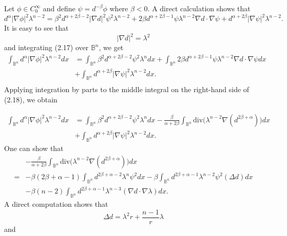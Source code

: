 \documentclass[12pt]{amsart}
\numberwithin{equation}{section}
\numberwithin{theorem}{section}
\numberwithin{theorem}{section} \numberwithin{lemma}{section}
\numberwithin{definition}{section}
\numberwithin{corollary}{section}
\numberwithin{remark}{section}
\numberwithin{proposition}{section}
\begin{document}
\proof  Let $\phi\in C_0^{\infty}$ and define $\psi=d^{-\beta}\phi$
where $\beta<0$. A direct calculation shows that
\begin{equation}
d^{\alpha}|\nabla\phi|^2\lambda^{n-2}
=\beta^2d^{\alpha+2\beta-2}|\nabla d|^2\psi^2\lambda^{n-2}+ 2\beta
d^{\alpha+2\beta-1}\psi \lambda^{n-2}\nabla
d\cdot\nabla\psi+d^{\alpha+2\beta}|\nabla\psi|^2 \lambda^{n-2}.
\end{equation}
It is easy to see that
\[|\nabla d|^2=\lambda^2\]
and integrating (2.17) over $ \mathbb{B}^n$, we get
\begin{equation}
\begin{aligned}\int_{\mathbb{B}^n}d^{\alpha}|\nabla\phi|^2 \lambda^{n-2}dx&=\int_{
\mathbb{B}^n}\beta^2 d^{\alpha+2\beta-2}\psi^2
\lambda^ndx+\int_{\mathbb{B}^n} 2\beta d^{\alpha+2\beta-1}\psi
\lambda^{n-2}\nabla d\cdot\nabla\psi dx\\&+\int_{\mathbb{B}^n}
d^{\alpha+2\beta}|\nabla\psi|^2 \lambda^{n-2}dx.\\
\end{aligned}
\end{equation}
Applying integration by parts to the middle integral on the
right-hand side of (2.18), we obtain

\begin{equation}
\begin{aligned}
\int_{\mathbb{B}^n}d^{\alpha}|\nabla\phi|^2
\lambda^{n-2}dx&=\int_{ \mathbb{B}^n}\beta^2
d^{\alpha+2\beta-2}\psi^2 \lambda^ndx
 -\frac{\beta}{\alpha+2\beta} \int_{\mathbb{B}^n}\text{div}\big(\lambda^{n-2}\nabla (d^{2\beta+\alpha})\big)dx \\
 &+\int_{\mathbb{B}^n}
d^{\alpha+2\beta}|\nabla\psi|^2 \lambda^{n-2}dx.
\end{aligned}
\end{equation}
One can show that
\begin{equation}
\begin{aligned}
&-\frac{\beta}{\alpha+2\beta}
\int_{\mathbb{B}^n}\text{div}\big(\lambda^{n-2}\nabla
(d^{2\beta+\alpha})\big)dx \\ =& -\beta (2\beta
+\alpha-1)\int_{\mathbb{B}^n}d^{2\beta+\alpha-2}\lambda^n\psi^2dx-\beta
\int_{\mathbb{B}^n}d^{2\beta+\alpha-1}\lambda^{n-2}\psi^2 (\Delta d)dx\\
&-\beta
(n-2)\int_{\mathbb{B}^n}d^{2\beta+\alpha-1}\lambda^{n-3}(\nabla
d\cdot \nabla \lambda) dx.
\end{aligned}
\end{equation}
A direct computation shows that
\[\Delta d=\lambda^2r+\frac{n-1}{r}\lambda\] and
\end{document}
